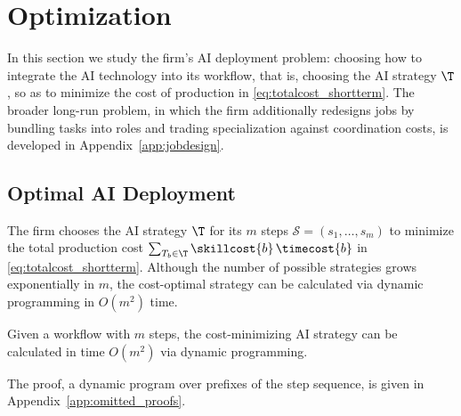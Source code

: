 \section{Optimization}

In this section we study the firm's AI deployment problem: choosing how to integrate the AI technology into its workflow, that is, choosing the AI strategy $\T$, so as to minimize the cost of production in \eqref{eq:totalcost_shortterm}.
The broader long-run problem, in which the firm additionally redesigns jobs by bundling tasks into roles and trading specialization against coordination costs, is developed in Appendix~\ref{app:jobdesign}.



\subsection{Optimal AI Deployment}
\label{sec:optimization.short}

The firm chooses the AI strategy $\T$ for its $m$ steps $\mathcal{S} = (s_1, \dotsc, s_m)$ to minimize the total production cost $\sum_{T_b \in \T} \skillcost{b}\,\timecost{b}$ in \eqref{eq:totalcost_shortterm}.
Although the number of possible strategies grows exponentially in $m$, the cost-optimal strategy can be calculated via dynamic programming in $O(m^2)$ time.

\begin{proposition}
\label{prop:shortrun_dp}
Given a workflow with $m$ steps, the cost-minimizing AI strategy can be calculated in time $O(m^2)$ via dynamic programming.
\end{proposition}

The proof, a dynamic program over prefixes of the step sequence, is given in Appendix~\ref{app:omitted_proofs}.
